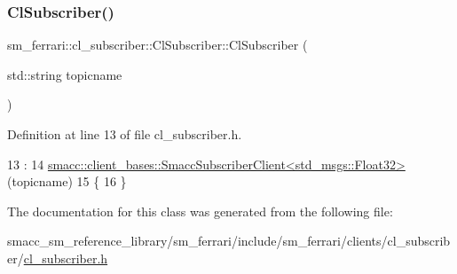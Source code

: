 \subsubsection{\texorpdfstring{Cl\+Subscriber()}{ClSubscriber()}}
{\footnotesize\ttfamily sm\+\_\+ferrari\+::cl\+\_\+subscriber\+::\+Cl\+Subscriber\+::\+Cl\+Subscriber (\begin{DoxyParamCaption}\item[{std\+::string}]{topicname }\end{DoxyParamCaption})\hspace{0.3cm}{\ttfamily [inline]}}



Definition at line 13 of file cl\+\_\+subscriber.\+h.


\begin{DoxyCode}
13                                      : 
14         \hyperlink{classsmacc_1_1client__bases_1_1SmaccSubscriberClient}{smacc::client\_bases::SmaccSubscriberClient<std\_msgs::Float32>}
      (topicname)
15     \{
16     \}
\end{DoxyCode}


The documentation for this class was generated from the following file\+:\begin{DoxyCompactItemize}
\item 
smacc\+\_\+sm\+\_\+reference\+\_\+library/sm\+\_\+ferrari/include/sm\+\_\+ferrari/clients/cl\+\_\+subscriber/\hyperlink{sm__ferrari_2include_2sm__ferrari_2clients_2cl__subscriber_2cl__subscriber_8h}{cl\+\_\+subscriber.\+h}\end{DoxyCompactItemize}
